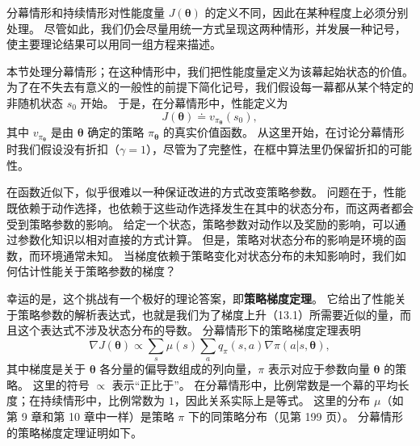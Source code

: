 \documentclass[UTF8,12pt,a4paper,fontset=fandol]{ctexart}
\begin{document}
分幕情形和持续情形对性能度量 $J(\boldsymbol{\theta})$ 的定义不同，因此在某种程度上必须分别处理。
尽管如此，我们仍会尽量用统一方式呈现这两种情形，并发展一种记号，使主要理论结果可以用同一组方程来描述。

本节处理分幕情形；在这种情形中，我们把性能度量定义为该幕起始状态的价值。
为了在不失去有意义的一般性的前提下简化记号，我们假设每一幕都从某个特定的非随机状态 $s_0$ 开始。
于是，在分幕情形中，性能定义为
\begin{equation}
J(\boldsymbol{\theta})\doteq v_{\pi_{\boldsymbol{\theta}}}(s_0),
\tag{13.4}
\end{equation}
其中 $v_{\pi_{\boldsymbol{\theta}}}$ 是由 $\boldsymbol{\theta}$ 确定的策略 $\pi_{\boldsymbol{\theta}}$ 的真实价值函数。
从这里开始，在讨论分幕情形时我们假设没有折扣（$\gamma=1$），尽管为了完整性，在框中算法里仍保留折扣的可能性。

在函数近似下，似乎很难以一种保证改进的方式改变策略参数。
问题在于，性能既依赖于动作选择，也依赖于这些动作选择发生在其中的状态分布，而这两者都会受到策略参数的影响。
给定一个状态，策略参数对动作以及奖励的影响，可以通过参数化知识以相对直接的方式计算。
但是，策略对状态分布的影响是环境的函数，而环境通常未知。
当梯度依赖于策略变化对状态分布的未知影响时，我们如何估计性能关于策略参数的梯度？

幸运的是，这个挑战有一个极好的理论答案，即\textbf{策略梯度定理}。
它给出了性能关于策略参数的解析表达式，也就是我们为了梯度上升（13.1）所需要近似的量，而且这个表达式不涉及状态分布的导数。
分幕情形下的策略梯度定理表明
\begin{equation}
\nabla J(\boldsymbol{\theta})\propto
\sum_s \mu(s)\sum_a q_\pi(s,a)\nabla\pi(a|s,\boldsymbol{\theta}),
\tag{13.5}
\end{equation}
其中梯度是关于 $\boldsymbol{\theta}$ 各分量的偏导数组成的列向量，$\pi$ 表示对应于参数向量 $\boldsymbol{\theta}$ 的策略。
这里的符号 $\propto$ 表示“正比于”。
在分幕情形中，比例常数是一个幕的平均长度；在持续情形中，比例常数为 $1$，因此关系实际上是等式。
这里的分布 $\mu$（如第 9 章和第 10 章中一样）是策略 $\pi$ 下的同策略分布（见第 199 页）。
分幕情形的策略梯度定理证明如下。
\end{document}
